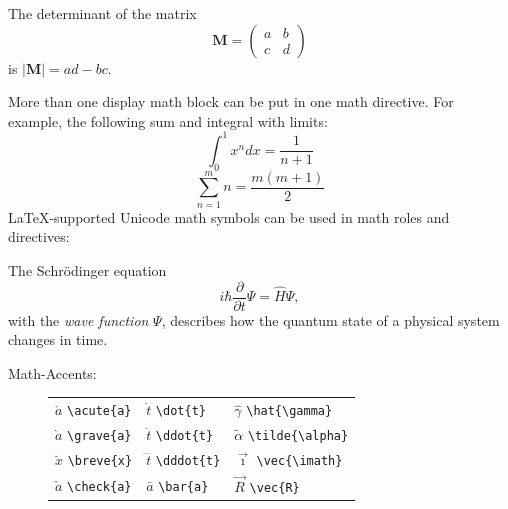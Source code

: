 \documentclass[a4paper]{memoir}
\newlength{\DUtablewidth} %
\begin{document}
The determinant of the matrix
%
\begin{equation*}
\mathbf{M} = \left(\begin{matrix}a&b\\c&d\end{matrix}\right)
\label{eq-m}
\end{equation*}
is $|\mathbf{M}| = ad - bc$.

More than one display math block can be put in one math directive.
For example, the following sum and integral with limits:
%
\begin{equation*}
\int_0^1 x^n dx = \frac{1}{n + 1}
\end{equation*}%
\begin{equation*}
\sum_{n=1}^m n = \frac{m(m+1)}{2}
\end{equation*}
LaTeX-supported Unicode math symbols can be used in math roles and
directives:

The Schrödinger equation
%
\begin{equation*}
i\hbar \frac{\partial }{\partial t}\Psi  = \hat{H}\Psi ,
\label{eq-schrodinger}
\end{equation*}
with the \emph{wave function} $\Psi $, describes how the quantum state of a
physical system changes in time.

\begin{description}
\item[{Math-Accents:}] \leavevmode
\setlength{\DUtablewidth}{1\linewidth}%
\begin{longtable*}{p{0.315\DUtablewidth}p{0.315\DUtablewidth}p{0.315\DUtablewidth}}

$\acute{a}$      \texttt{\textbackslash{}acute\{a\}}
 & 
$\dot{t}$        \texttt{\textbackslash{}dot\{t\}}
 & 
$\hat{\gamma}$   \texttt{\textbackslash{}hat\{\textbackslash{}gamma\}}
 \\

$\grave{a}$      \texttt{\textbackslash{}grave\{a\}}
 & 
$\ddot{t}$       \texttt{\textbackslash{}ddot\{t\}}
 & 
$\tilde{\alpha}$ \texttt{\textbackslash{}tilde\{\textbackslash{}alpha\}}
 \\

$\breve{x}$      \texttt{\textbackslash{}breve\{x\}}
 & 
$\dddot{t}$      \texttt{\textbackslash{}dddot\{t\}}
 & 
$\vec{\imath}$   \texttt{\textbackslash{}vec\{\textbackslash{}imath\}}
 \\

$\check{a}$      \texttt{\textbackslash{}check\{a\}}
 & 
$\bar{a}$        \texttt{\textbackslash{}bar\{a\}}
 & 
$\vec{R}$        \texttt{\textbackslash{}vec\{R\}}
 \\
\end{longtable*}
\end{description}
\end{document}
